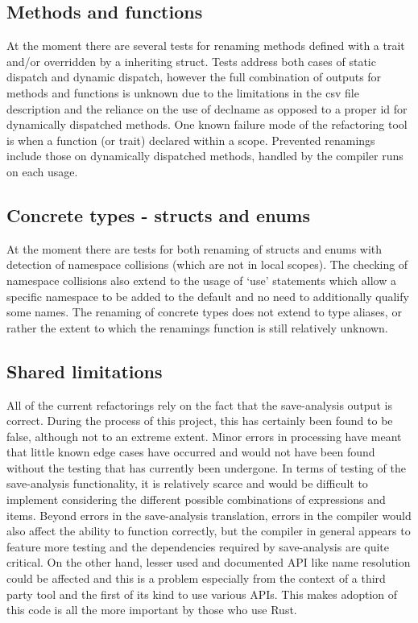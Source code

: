 
\subsection{Methods and functions}
At the moment there are several tests for renaming methods defined with a trait and/or overridden by a inheriting struct. Tests address both cases of static dispatch and dynamic dispatch, however the full combination of outputs for methods and functions is unknown due to the limitations in the csv file description and the reliance on the use of declname as opposed to a proper id for dynamically dispatched methods. One known failure mode of the refactoring tool is when a function (or trait) declared within a scope. Prevented renamings include those on dynamically dispatched methods, handled by the compiler runs on each usage.

\subsection{Concrete types - structs and enums}
At the moment there are tests for both renaming of structs and enums with detection of namespace collisions (which are not in local scopes). The checking of namespace collisions also extend to the usage of `use' statements which allow a specific namespace to be added to the default and no need to additionally qualify some names. The renaming of concrete types does not extend to type aliases, or rather the extent to which the renamings function is still relatively unknown.

\subsection{Shared limitations}
All of the current refactorings rely on the fact that the save-analysis output is correct. During the process of this project, this has certainly been found to be false, although not to an extreme extent. Minor errors in processing have meant that little known edge cases have occurred and would not have been found without the testing that has currently been undergone. In terms of testing of the save-analysis functionality, it is relatively scarce and would be difficult to implement considering the different possible combinations of expressions and items. Beyond errors in the save-analysis translation, errors in the compiler would also affect the ability to function correctly, but the compiler in general appears to feature more testing and the dependencies required by save-analysis are quite critical. On the other hand, lesser used and documented API like name resolution could be affected and this is a problem especially from the context of a third party tool and the first of its kind to use various APIs. This makes adoption of this code is all the more important by those who use Rust.

